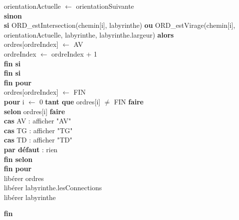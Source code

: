 \documentclass[a4paper, 11pt]{article}
\begin{document}
\begin{flushleft}
    \hspace*{3cm}orientationActuelle $\gets$ orientationSuivante\\
    \hspace*{2cm}\textbf{sinon}\\
    \hspace*{3cm}\textbf{si} ORD\_estIntersection(chemin[i], labyrinthe) \textbf{ou} ORD\_estVirage(chemin[i], orientationActuelle, labyrinthe, labyrinthe.largeur) \textbf{alors}\\
    \hspace*{4cm}ordres[ordreIndex] $\gets$ AV\\
    \hspace*{4cm}ordreIndex $\gets$ ordreIndex + 1\\
    \hspace*{3cm}\textbf{fin si}\\
    \hspace*{2cm}\textbf{fin si}\\
    \hspace*{1cm}\textbf{fin pour}\\
    \hspace*{1cm}ordres[ordreIndex] $\gets$ FIN\\

    \hspace*{1cm}\textbf{pour} i $\gets$ 0 \textbf{tant que} ordres[i] $\neq$ FIN \textbf{faire}\\
    \hspace*{2cm}\textbf{selon} ordres[i] \textbf{faire}\\
    \hspace*{3cm}\textbf{cas} AV : afficher "AV"\\
    \hspace*{3cm}\textbf{cas} TG : afficher "TG"\\
    \hspace*{3cm}\textbf{cas} TD : afficher "TD"\\
    \hspace*{3cm}\textbf{par défaut} : rien\\
    \hspace*{2cm}\textbf{fin selon}\\
    \hspace*{1cm}\textbf{fin pour}\\
    \hspace*{1cm}libérer ordres\\
    \hspace*{1cm}libérer labyrinthe.lesConnections\\
    \hspace*{1cm}libérer labyrinthe
\end{flushleft}
\textbf{fin}
\end{document}
